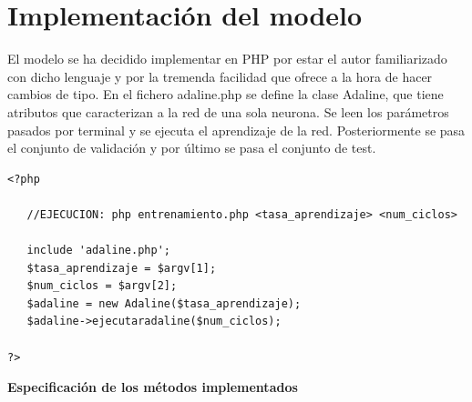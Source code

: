 \documentclass[11pt,spanish,listoffigures,listoftables]{workluis}
\begin{document}
\section{Implementación del modelo}

\par El modelo se ha decidido implementar en PHP por estar el autor familiarizado con dicho lenguaje y por la tremenda facilidad que ofrece a la hora de hacer cambios de tipo. En el fichero adaline.php se define la clase Adaline, que tiene atributos que caracterizan a la red de una sola neurona. Se leen los parámetros pasados por terminal y se ejecuta el aprendizaje de la red. Posteriormente se pasa el conjunto de validación y por último se pasa el conjunto de test.

\begin{lstlisting}
<?php

   //EJECUCION: php entrenamiento.php <tasa_aprendizaje> <num_ciclos>

   include 'adaline.php';
   $tasa_aprendizaje = $argv[1];
   $num_ciclos = $argv[2];
   $adaline = new Adaline($tasa_aprendizaje);
   $adaline->ejecutaradaline($num_ciclos);

?>
\end{lstlisting}

\par \textbf{Especificación de los métodos implementados}
\end{document}
